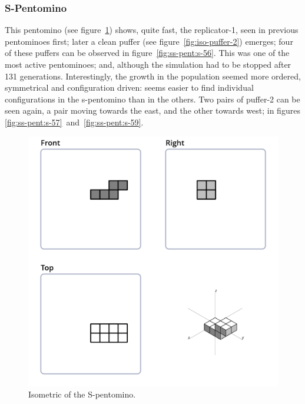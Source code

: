 \subsubsection{S-Pentomino}
\label{sec:s-pentomino}
This pentomino (see figure~\ref{fig:iso-pent-s}) shows, quite fast, the
replicator-1, seen in previous pentominoes first; later a clean puffer
(see figure~\ref{fig:iso-puffer-2}) emerges; four of these puffers can be
observed in figure~\ref{fig:ss-pent:s-56}. This was one of the most active
pentominoes; and, although the simulation had to be stopped after 131
generations. Interestingly, the growth in the population seemed more ordered,
symmetrical and configuration driven: seems easier to find individual
configurations in the s-pentomino than in the others. Two pairs of puffer-2
can be seen again, a pair moving towards the east, and the other towards west;
in figures \ref{fig:ss-pent:s-57}~and~\ref{fig:ss-pent:s-59}.

\begin{figure}
	\centering
	\includegraphics[scale=0.3]{iso_diagrams/s.png}
	\caption{Isometric of the S-pentomino.}
  \label{fig:iso-pent-s}
\end{figure}

